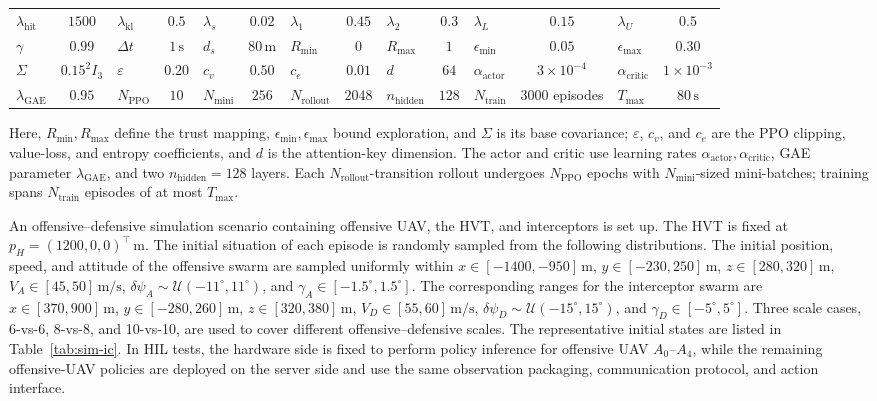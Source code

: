 \documentclass{cja}
\begin{document}
\begin{table}[!t]
{\begin{tabular}{@{}lc|lc|lc|lc|lc|lc|lc@{}}
$\lambda_{\mathrm{hit}}$ & $1500$ & $\lambda_{\mathrm{kl}}$ & $0.5$ & $\lambda_s$ & $0.02$ & $\lambda_1$ & $0.45$ & $\lambda_2$ & $0.3$ & $\lambda_L$ & $0.15$ & $\lambda_U$ & $0.5$ \\
$\gamma$ & $0.99$ & $\Delta t$ & $1\,\mathrm{s}$ & $d_s$ & $80\,\mathrm{m}$ & $R_{\min}$ & $0$ & $R_{\max}$ & $1$ & $\epsilon_{\min}$ & $0.05$ & $\epsilon_{\max}$ & $0.30$ \\
$\Sigma$ & $0.15^2 I_3$ & $\varepsilon$ & $0.20$ & $c_v$ & $0.50$ & $c_e$ & $0.01$ & $d$ & $64$ & $\alpha_{\mathrm{actor}}$ & $3{\times}10^{-4}$ & $\alpha_{\mathrm{critic}}$ & $1{\times}10^{-3}$ \\
$\lambda_{\mathrm{GAE}}$ & $0.95$ & $N_{\mathrm{PPO}}$ & $10$ & $N_{\mathrm{mini}}$ & $256$ & $N_{\mathrm{rollout}}$ & $2048$ & $n_{\mathrm{hidden}}$ & $128$ & $N_{\mathrm{train}}$ & $3000$ episodes & $T_{\max}$ & $80\,\mathrm{s}$ \\
\bottomrule
\end{tabular}%
}
\end{table}

Here, $R_{\min},R_{\max}$ define the trust mapping, $\epsilon_{\min},\epsilon_{\max}$ bound exploration, and $\Sigma$ is its base covariance; $\varepsilon$, $c_v$, and $c_e$ are the PPO clipping, value-loss, and entropy coefficients, and $d$ is the attention-key dimension. The actor and critic use learning rates $\alpha_{\mathrm{actor}},\alpha_{\mathrm{critic}}$, GAE parameter $\lambda_{\mathrm{GAE}}$, and two $n_{\mathrm{hidden}}=128$ layers. Each $N_{\mathrm{rollout}}$-transition rollout undergoes $N_{\mathrm{PPO}}$ epochs with $N_{\mathrm{mini}}$-sized mini-batches; training spans $N_{\mathrm{train}}$ episodes of at most $T_{\max}$.

An offensive--defensive simulation scenario containing offensive UAV, the HVT, and interceptors is set up. The HVT is fixed at $p_H=(1200,0,0)^\top\,\mathrm{m}$.
The initial situation of each episode is randomly sampled from the following distributions. The initial position, speed, and attitude of the offensive swarm are sampled uniformly within $x\in[-1400,-950]\,\mathrm{m}$, $y\in[-230,250]\,\mathrm{m}$, $z\in[280,320]\,\mathrm{m}$, $V_A\in[45,50]\,\mathrm{m/s}$, $\delta\psi_A\sim\mathcal{U}(-11^\circ,11^\circ)$, and $\gamma_A\in[-1.5^\circ,1.5^\circ]$. The corresponding ranges for the interceptor swarm are $x\in[370,900]\,\mathrm{m}$, $y\in[-280,260]\,\mathrm{m}$, $z\in[320,380]\,\mathrm{m}$, $V_D\in[55,60]\,\mathrm{m/s}$, $\delta\psi_D\sim\mathcal{U}(-15^\circ,15^\circ)$, and $\gamma_D\in[-5^\circ,5^\circ]$.
Three scale cases, 6-vs-6, 8-vs-8, and 10-vs-10, are used to cover different offensive--defensive scales. The representative initial states are listed in Table~\ref{tab:sim-ic}.
In HIL tests, the hardware side is fixed to perform policy inference for offensive UAV $A_0$--$A_4$, while the remaining offensive-UAV policies are deployed on the server side and use the same observation packaging, communication protocol, and action interface.
\end{document}
